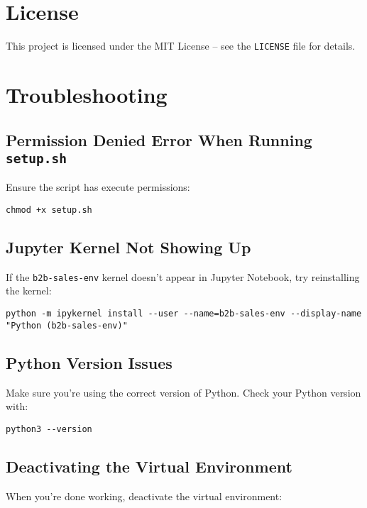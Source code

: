 \documentclass{article}
\begin{document}
\section{License}

This project is licensed under the MIT License -- see the \verb|LICENSE| file for details.

\section{Troubleshooting}

\subsection{Permission Denied Error When Running \texttt{setup.sh}}

Ensure the script has execute permissions:

\begin{verbatim}
chmod +x setup.sh
\end{verbatim}

\subsection{Jupyter Kernel Not Showing Up}

If the \verb|b2b-sales-env| kernel doesn't appear in Jupyter Notebook, try reinstalling the kernel:

\begin{verbatim}
python -m ipykernel install --user --name=b2b-sales-env --display-name "Python (b2b-sales-env)"
\end{verbatim}

\subsection{Python Version Issues}

Make sure you're using the correct version of Python. Check your Python version with:

\begin{verbatim}
python3 --version
\end{verbatim}

\subsection{Deactivating the Virtual Environment}

When you're done working, deactivate the virtual environment:
\end{document}
